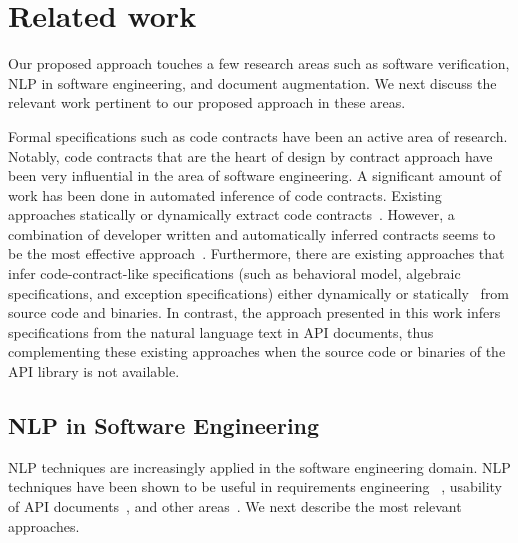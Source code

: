\section{Related work}
\label{sec:related}


Our proposed approach touches a few research areas such as software verification,
NLP in software engineering, and document augmentation.
We next discuss the relevant work pertinent to our proposed approach in these areas.

Formal specifications such as code contracts have been an active area of research.
Notably, code contracts that are the heart of design by contract approach have been very influential in the area of software engineering.
A significant amount of work has been done in automated inference of code contracts.
Existing approaches statically or dynamically extract code contracts~\cite{csallner08dysy,NimmerE02:ISSTA,Tillmann:2006:DLM:2105385.2105433}.
However, a combination of developer written and automatically inferred contracts seems to be the most effective approach~\cite{Polikarpova2009ISSTA,Flanagan2001:HAA}.
Furthermore, there are existing approaches that infer code-contract-like specifications
(such as behavioral model, algebraic specifications, and exception specifications) either dynamically\cite{Henkel07discoveringdocumentation,Ghezzi:2009:SIB:1555001.1555057,Henkel:2008:DDA:1363102.1363105} or statically~\cite{Flanagan2001:HAA,Buse:2008:ADI:1390630.1390664} from source code and binaries.
In contrast, the approach presented in this work infers specifications from the natural language text in API documents,
thus complementing these existing approaches when the source code or binaries of the API library is not available.


\subsection{NLP in Software Engineering}

NLP techniques are increasingly applied in the software engineering domain. 
NLP techniques have been shown to be useful in requirements engineering ~\cite{Sinha2009,Sinha2010,Gervasi2005},
usability of API documents~\cite{Dekel2009}, and other areas~\cite{Zhou2008,Little2009,pandita13:WHYPER}.
We next describe the most relevant approaches.


